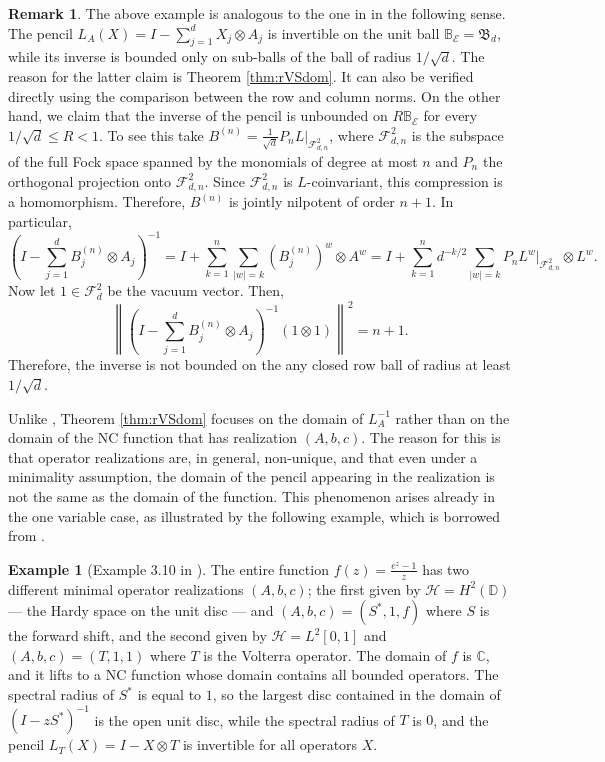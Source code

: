 \documentclass[12pt]{amsart}
\numberwithin{equation}{section}
\theoremstyle{definition}
\newtheorem{example}[theorem]{Example}
\newtheorem{remark}[theorem]{Remark}
\newcommand{\cE}{\mathcal{E}}
\newcommand{\cF}{\mathcal{F}}
\newcommand{\cH}{\mathcal{H}}
\newcommand{\bB}{\mathbb{B}}
\newcommand{\bC}{\mathbb{C}}
\newcommand{\bD}{\mathbb{D}}
\newcommand{\fB}{{\mathfrak{B}}}
\begin{document}
\begin{remark}
    The above example is analogous to the one in \cite{Pascoe20} in the following sense. The pencil $L_A(X) = I - \sum_{j=1}^d X_j \otimes A_j$ is invertible on the unit ball $\bB_\cE = \fB_d$, while its inverse is bounded only on sub-balls of the ball of radius $1/\sqrt{d}$. The reason for the latter claim is Theorem \ref{thm:rVSdom}. It can also be verified directly using the comparison between the row and column norms. On the other hand, we claim that the inverse of the pencil is unbounded on $R\bB_{\cE}$ for every $1/\sqrt{d} \leq R < 1$. To see this take $B^{(n)} = \frac{1}{\sqrt{d}} P_n L|_{\cF^2_{d,n}}$, where $\cF^2_{d,n}$ is the subspace of the full Fock space spanned by the monomials of degree at most $n$ and $P_n$ the orthogonal projection onto $\cF^2_{d,n}$. Since $\cF^2_{d,n}$ is $L$-coinvariant, this compression is a homomorphism. Therefore, $B^{(n)}$ is jointly nilpotent of order $n+1$. In particular,
    \[
    \left(I - \sum_{j=1}^d B_j^{(n)} \otimes A_j\right)^{-1} = I + \sum_{k=1}^n \sum_{|w|=k} (B_j^{(n)})^w \otimes A^w = I + \sum_{k=1}^n d^{-k/2} \sum_{|w|=k} P_n L^w|_{\cF^2_{d,n}} \otimes L^w.
    \]
    Now let $1 \in \cF^2_d$ be the vacuum vector. Then,
    \[
    \left\| \left(I - \sum_{j=1}^d B_j^{(n)} \otimes A_j\right)^{-1}(1 \otimes 1) \right\|^2 = n + 1.
    \]
    Therefore, the inverse is not bounded on the any closed  row ball of radius at least $1/\sqrt{d}$. 
\end{remark}

Unlike \cite[Theorem 3.4]{shalsham2025spectral}, Theorem \ref{thm:rVSdom} focuses on the domain of $L_A^{-1}$ rather than on the domain of the NC function that has realization $(A,b,c)$. 
The reason for this is that operator realizations are, in general, non-unique, and that even under a minimality assumption, the domain of the pencil appearing in the realization is not the same as the domain of the function. 
This phenomenon arises already in the one variable case, as illustrated by the following example, which is borrowed from \cite{augat2025operator}. 

\begin{example}[Example 3.10 in \cite{augat2025operator}]
The entire function $f(z) = \frac{e^z-1}{z}$ has two different minimal operator realizations $(A,b,c)$; the first given by $\cH = H^2(\bD)$ --- the Hardy space on the unit disc --- and $(A,b,c) = (S^*,1,f)$ where $S$ is the forward shift, and the second given by $\cH = L^2[0,1]$ and $(A,b,c) = (T,1,1)$ where $T$ is the Volterra operator. The domain of $f$ is $\bC$, and it lifts to a NC function whose domain contains all bounded operators. 
The spectral radius of $S^*$ is equal to $1$, so the largest disc contained in the domain of $(I - zS^*)^{-1}$ is the open unit disc, while the spectral radius of $T$ is $0$, and the pencil $L_T(X) = I - X \otimes T$ is invertible for all operators $X$. 
\end{example}
\end{document}
